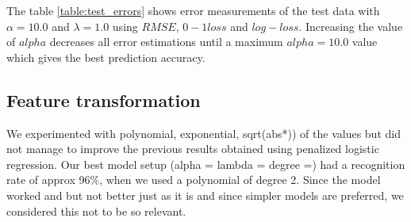 The table \ref{table:test_errors} shows error measurements of the test data with $\alpha=10.0$ and $\lambda=1.0$ using $RMSE$, $0-1 loss$ and $log-loss$. Increasing the value of $alpha$ decreases all error estimations until a maximum $alpha=10.0$ value which gives the best prediction accuracy.

\subsection{Feature transformation}
We experimented with polynomial, exponential, sqrt(abs*)) of the values
but did not manage to improve the previous results obtained using penalized logistic regression. Our best model setup (alpha = lambda = degree =) had a recognition rate of approx 96$\%$, when we used a polynomial of degree 2.
Since the model worked  and but not better just as it is
and since simpler models are preferred, we considered this not to be so relevant.